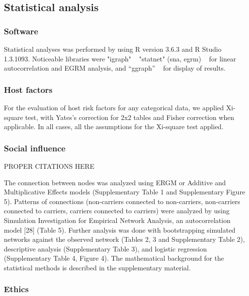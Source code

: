 \documentclass[10pt, a4paper, onecolumn]{article} %
\begin{document}
\subsection{Statistical analysis} 

\subsubsection{Software}

Statistical analyses was performed by using R version 3.6.3 and R Studio 1.3.1093. Noticeable libraries were "igraph" ~\cite{ref:igraph} "statnet" (sna, egrm) ~\cite{ref:statnet} for linear autocorrelation and EGRM analysis, and “ggraph” ~\cite{ref:ggraph} for display of results.\\


\subsubsection{Host factors}

For the evaluation of host risk factors for any categorical data, we applied Xi-square test, with Yates's correction for 2x2 tables and Fisher correction when applicable. In all cases, all the assumptions for the Xi-square test applied.\\

\subsubsection{Social influence}

PROPER CITATIONS HERE

The connection between nodes was analyzed using ERGM or Additive and Multiplicative Effects models (Supplementary Table 1 and Supplementary Figure 5). Patterns of connections (non-carriers connected to non-carriers, non-carriers connected to carriers, carriers connected to carriers) were analyzed by using Simulation Investigation for Empirical Network Analysis, an autocorrelation model [28] (Table 5). Further analysis was done with bootstrapping simulated networks against the observed network (Tables 2, 3 and Supplementary Table 2), descriptive analysis (Supplementary Table 3), and logistic regression (Supplementary Table 4, Figure 4). The mathematical background for the statistical methods is described in the supplementary material.\\

\subsubsection{Ethics}
 
\end{document}
